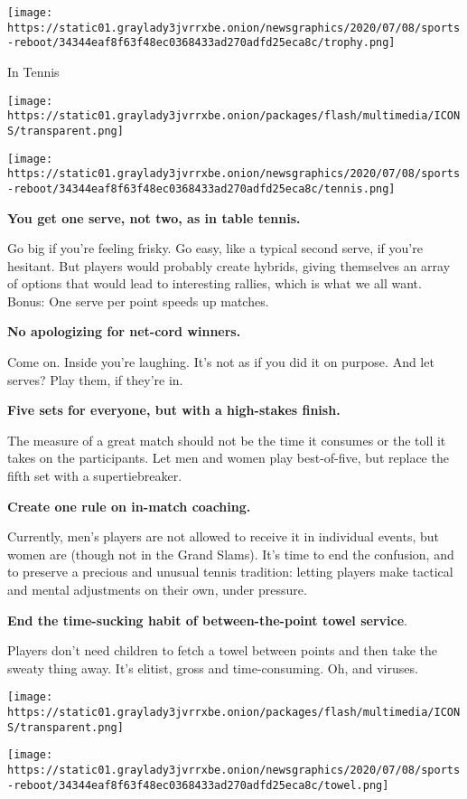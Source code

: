 \texttt{[image: https://static01.graylady3jvrrxbe.onion/newsgraphics/2020/07/08/sports-reboot/34344eaf8f63f48ec0368433ad270adfd25eca8c/trophy.png]}

In Tennis

\texttt{[image: https://static01.graylady3jvrrxbe.onion/packages/flash/multimedia/ICONS/transparent.png]}

\texttt{[image: https://static01.graylady3jvrrxbe.onion/newsgraphics/2020/07/08/sports-reboot/34344eaf8f63f48ec0368433ad270adfd25eca8c/tennis.png]}

\textbf{You get one serve, not two, as in table tennis.}

Go big if you're feeling frisky. Go easy, like a typical second serve,
if you're hesitant. But players would probably create hybrids, giving
themselves an array of options that would lead to interesting rallies,
which is what we all want. Bonus: One serve per point speeds up matches.

\textbf{No apologizing for net-cord winners.}

Come on. Inside you're laughing. It's not as if you did it on purpose.
And let serves? Play them, if they're in.

\textbf{Five sets for everyone, but with a high-stakes finish.}

The measure of a great match should not be the time it consumes or the
toll it takes on the participants. Let men and women play best-of-five,
but replace the fifth set with a supertiebreaker.

\textbf{Create one rule on in-match coaching.}

Currently, men's players are not allowed to receive it in individual
events, but women are (though not in the Grand Slams). It's time to end
the confusion, and to preserve a precious and unusual tennis tradition:
letting players make tactical and mental adjustments on their own, under
pressure.

\textbf{End the time-sucking habit of between-the-point towel service}.

Players don't need children to fetch a towel between points and then
take the sweaty thing away. It's elitist, gross and time-consuming. Oh,
and viruses.

\texttt{[image: https://static01.graylady3jvrrxbe.onion/packages/flash/multimedia/ICONS/transparent.png]}

\texttt{[image: https://static01.graylady3jvrrxbe.onion/newsgraphics/2020/07/08/sports-reboot/34344eaf8f63f48ec0368433ad270adfd25eca8c/towel.png]}

